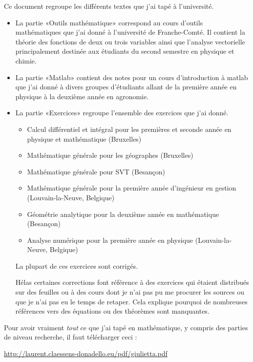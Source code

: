 Ce document regroupe les différents textes que j'ai tapé à l'université.
\begin{itemize}
    \item La partie «Outils mathématique» correspond au cours d'outils mathématiques que j'ai donné à l'université de Franche-Comté. Il contient la théorie des fonctions de deux ou trois variables ainsi que l'analyse vectorielle principalement destinée aux étudiants du second semestre en physique et chimie.
    \item La partie «Matlab» contient des notes pour un cours d'introduction à matlab que j'ai donné à divers groupes d'étudiants allant de la première année en physique à la deuxième année en agronomie.

    \item La partie «Exercices» regroupe l'ensemble des exercices que j'ai donné.

        \begin{itemize}
            \item Calcul différentiel et intégral pour les premières et seconde année en physique et mathématique (Bruxelles)
            \item Mathématique générale pour les géographes (Bruxelles)
            \item Mathématique générale pour SVT (Besançon)
            \item Mathématique générale pour la première année d'ingénieur en gestion (Louvain-la-Neuve, Belgique)
            \item Géométrie analytique pour la deuxième année en mathématique (Besançon)
            \item Analyse numérique pour la première année en physique (Louvain-la-Neuve, Belgique)
        \end{itemize}
        La plupart de ces exercices sont corrigés.

        Hélas certaines corrections font référence à des exercices qui étaient distribués sur des feuilles ou à des cours dont je n'ai pas pu me procurer les sources ou que je n'ai pas eu le temps de retaper. Cela explique pourquoi de nombreuses références vers des équations ou des théorèmes sont manquantes.
\end{itemize}

\vfill

Pour avoir vraiment \emph{tout} ce que j'ai tapé en mathématique, y compris des parties de niveau recherche, il faut télécharger ceci :
\begin{center}
    \url{http://laurent.claessens-donadello.eu/pdf/giulietta.pdf}
\end{center}

\clearpage

